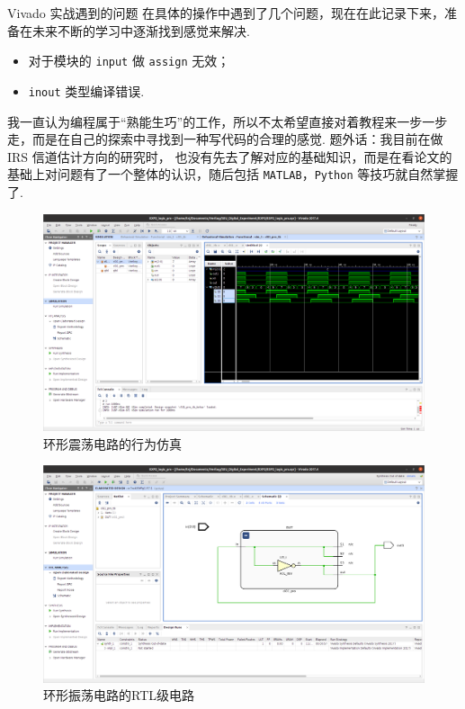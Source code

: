 \documentclass[11pt]{SEU-Digital-Report}
\begin{document}
                \begin{idea}{Vivado 实战遇到的问题}{}
                    在具体的操作中遇到了几个问题，现在在此记录下来，准备在未来不断的学习中逐渐找到感觉来解决.
                    \begin{itemize}
                        \item 对于模块的 \texttt{input} 做 \texttt{assign} 无效；
                        \item \texttt{inout} 类型编译错误.
                    \end{itemize}
                    我一直认为编程属于``熟能生巧''的工作，所以不太希望直接对着教程来一步一步走，而是在自己的探索中寻找到一种写代码的合理的感觉.
                    {
                        \kaishu
                        题外话：我目前在做 IRS 信道估计方向的研究时，
                        也没有先去了解对应的基础知识，而是在看论文的基础上对问题有了一个整体的认识，随后包括 \texttt{MATLAB}，\texttt{Python} 等技巧就自然掌握了.
                    }
                \end{idea}

                \begin{figure}[htbp]
                    \includegraphics[width=\linewidth]{fig/vivado/4_simu.png}
                    \caption{环形震荡电路的行为仿真}
                    \label{fig:vivado_4_simu}
                \end{figure}
    
                \begin{figure}[htbp]
                    \includegraphics[width=\linewidth]{fig/vivado/4_RTL.png}
                    \caption{环形振荡电路的RTL级电路}
                    \label{fig:vivado_4_RTL}
                \end{figure}
\end{document}
